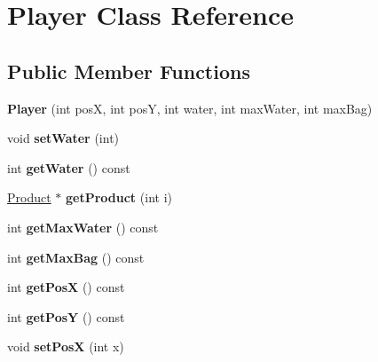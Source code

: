 \hypertarget{class_player}{}\section{Player Class Reference}
\label{class_player}
\subsection*{Public Member Functions}
\begin{DoxyCompactItemize}
\item 
\mbox{\label{class_player_a02d4e00f71b2f70b9f917e582f11aefb}} 
{\bfseries Player} (int posX, int posY, int water, int max\+Water, int max\+Bag)
\item 
\mbox{\label{class_player_af71fdee0fe8a00a06521b7c79327006f}} 
void {\bfseries set\+Water} (int)
\item 
\mbox{\label{class_player_a2b70784c09c76a98a8a2919c9b094edb}} 
int {\bfseries get\+Water} () const
\item 
\mbox{\label{class_player_aef69d391ed9d8046daf57f68a54529ea}} 
\mbox{\hyperlink{class_product}{Product}} $\ast$ {\bfseries get\+Product} (int i)
\item 
\mbox{\label{class_player_a48a2e33f8cff621cac49db39f0a17b7b}} 
int {\bfseries get\+Max\+Water} () const
\item 
\mbox{\label{class_player_a305b7ce14df845b19ad0fcc8d3fc9ef0}} 
int {\bfseries get\+Max\+Bag} () const
\item 
\mbox{\label{class_player_a1855ae5f29f7f22a4699733692e48fce}} 
int {\bfseries get\+PosX} () const
\item 
\mbox{\label{class_player_a06487efec49f46828c3167bbe122bde7}} 
int {\bfseries get\+PosY} () const
\item 
\mbox{\label{class_player_a87d2b1a1febdf144da490041392fa740}} 
void {\bfseries set\+PosX} (int x)
\item 
\mbox{\label{class_player_ad3ae76dabc09c107af39b1e954fb4055}} 

\end{DoxyCompactItemize}
